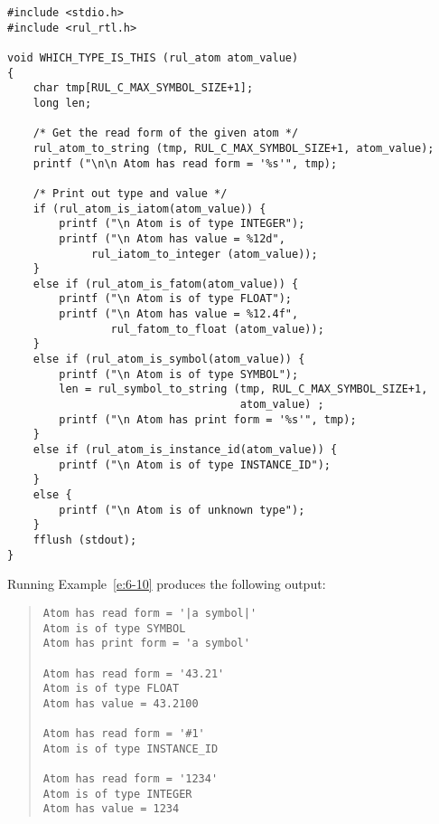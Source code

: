\begin{exampl}
\begin{verbatim}
#include <stdio.h>
#include <rul_rtl.h>

void WHICH_TYPE_IS_THIS (rul_atom atom_value)
{
    char tmp[RUL_C_MAX_SYMBOL_SIZE+1];
    long len;

    /* Get the read form of the given atom */
    rul_atom_to_string (tmp, RUL_C_MAX_SYMBOL_SIZE+1, atom_value);
    printf ("\n\n Atom has read form = '%s'", tmp);

    /* Print out type and value */
    if (rul_atom_is_iatom(atom_value)) {
        printf ("\n Atom is of type INTEGER");
        printf ("\n Atom has value = %12d",
             rul_iatom_to_integer (atom_value));
    }
    else if (rul_atom_is_fatom(atom_value)) {
        printf ("\n Atom is of type FLOAT");
        printf ("\n Atom has value = %12.4f", 
                rul_fatom_to_float (atom_value));
    }
    else if (rul_atom_is_symbol(atom_value)) {
        printf ("\n Atom is of type SYMBOL");
        len = rul_symbol_to_string (tmp, RUL_C_MAX_SYMBOL_SIZE+1,
                                    atom_value) ;
        printf ("\n Atom has print form = '%s'", tmp);
    }
    else if (rul_atom_is_instance_id(atom_value)) {
        printf ("\n Atom is of type INSTANCE_ID");
    }
    else {
        printf ("\n Atom is of unknown type");
    }
    fflush (stdout);
}
\end{verbatim}
\label{e:6-11}
\end{exampl}

Running Example~\ref{e:6-10} produces the following output:

\begin{quote}
\begin{verbatim}
Atom has read form = '|a symbol|'
Atom is of type SYMBOL
Atom has print form = 'a symbol'

Atom has read form = '43.21'
Atom is of type FLOAT
Atom has value = 43.2100

Atom has read form = '#1'
Atom is of type INSTANCE_ID

Atom has read form = '1234'
Atom is of type INTEGER
Atom has value = 1234
\end{verbatim}
\end{quote}

